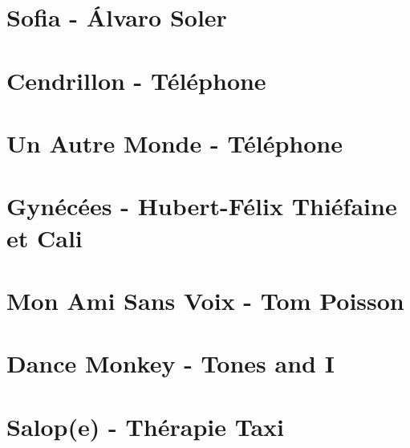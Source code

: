 \documentclass{guitartabs}
\begin{document}
\section{Sofia - Álvaro Soler}
\begin{guitar}

\end{guitar}

\section{Cendrillon - Téléphone}
\begin{guitar}

\end{guitar}

\section*{Un Autre Monde - Téléphone}
\begin{guitar}

\end{guitar}

\section{Gynécées - Hubert-Félix Thiéfaine et Cali}
\begin{guitar}

\end{guitar}


\section{Mon Ami Sans Voix - Tom Poisson}
\begin{guitar}

\end{guitar}

\section{Dance Monkey - Tones and I}
\begin{guitar}

\end{guitar}

\section{Salop(e) - Thérapie Taxi}
\begin{guitar}

\end{guitar}
\end{document}
